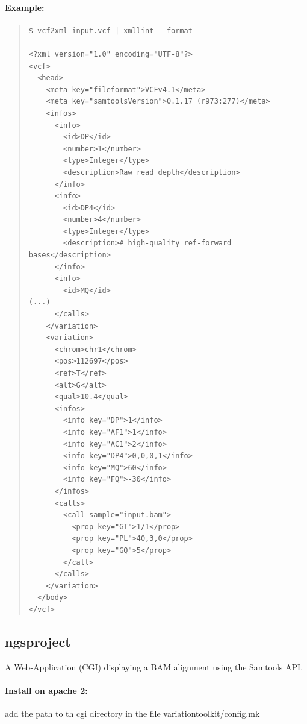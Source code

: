 \documentclass[12pt]{article}
\begin{document}
\paragraph{Example:}
\begin{quote}
\begin{verbatim}
$ vcf2xml input.vcf | xmllint --format -

<?xml version="1.0" encoding="UTF-8"?>
<vcf>
  <head>
    <meta key="fileformat">VCFv4.1</meta>
    <meta key="samtoolsVersion">0.1.17 (r973:277)</meta>
    <infos>
      <info>
        <id>DP</id>
        <number>1</number>
        <type>Integer</type>
        <description>Raw read depth</description>
      </info>
      <info>
        <id>DP4</id>
        <number>4</number>
        <type>Integer</type>
        <description># high-quality ref-forward bases</description>
      </info>
      <info>
        <id>MQ</id>
(...)
      </calls>
    </variation>
    <variation>
      <chrom>chr1</chrom>
      <pos>112697</pos>
      <ref>T</ref>
      <alt>G</alt>
      <qual>10.4</qual>
      <infos>
        <info key="DP">1</info>
        <info key="AF1">1</info>
        <info key="AC1">2</info>
        <info key="DP4">0,0,0,1</info>
        <info key="MQ">60</info>
        <info key="FQ">-30</info>
      </infos>
      <calls>
        <call sample="input.bam">
          <prop key="GT">1/1</prop>
          <prop key="PL">40,3,0</prop>
          <prop key="GQ">5</prop>
        </call>
      </calls>
    </variation>
  </body>
</vcf>

\end{verbatim}
\end{quote}

\subsection{ngsproject}
A Web-Application (CGI) displaying a BAM alignment using the Samtools API.

\paragraph{Install on apache 2:}
add the path to th cgi directory in the file variationtoolkit/config.mk
\end{document}
